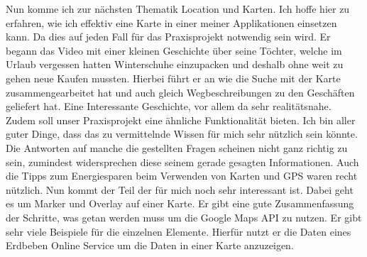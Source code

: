 \documentclass[12pt,a4paper,bibliography=totocnumbered,listof=totocnumbered]{scrartcl}
\begin{document}
Nun komme ich zur nächsten Thematik Location und Karten. Ich hoffe hier zu erfahren, wie ich effektiv eine Karte in einer meiner Applikationen einsetzen kann. Da dies auf jeden Fall für das Praxisprojekt notwendig sein wird. 
Er begann das Video mit einer kleinen Geschichte über seine Töchter, welche im Urlaub vergessen hatten Winterschuhe einzupacken und deshalb ohne weit zu gehen neue Kaufen mussten. Hierbei führt er an wie die Suche mit der Karte zusammengearbeitet hat und auch gleich Wegbeschreibungen zu den Geschäften geliefert hat. 
Eine Interessante Geschichte, vor allem da sehr realitätsnahe. Zudem soll unser Praxisprojekt eine ähnliche Funktionalität bieten. Ich bin aller guter Dinge, dass das zu vermittelnde Wissen für mich sehr nützlich sein könnte. 
Die Antworten auf manche die gestellten Fragen scheinen nicht ganz richtig zu sein, zumindest widersprechen diese seinem gerade gesagten Informationen. Auch die Tipps zum Energiesparen beim Verwenden von Karten und GPS waren recht nützlich. 
Nun kommt der Teil der für mich noch sehr interessant ist. Dabei geht es um Marker und Overlay auf einer Karte. Er gibt eine gute Zusammenfassung der Schritte, was getan werden muss um die Google Maps API zu nutzen. Er gibt sehr viele Beispiele für die einzelnen Elemente. Hierfür nutzt er die Daten eines Erdbeben Online Service um die Daten in einer Karte anzuzeigen. 
\end{document}

